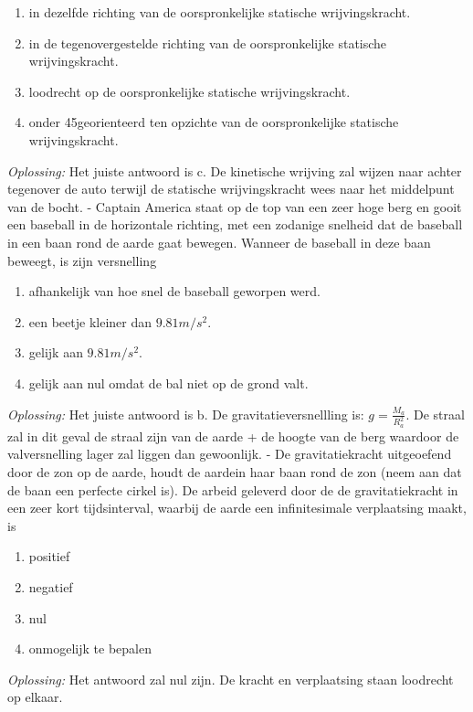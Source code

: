 \documentclass[12pt,a4paper]{article}
\begin{document}
	\begin{enumerate}[label=\alph*]
		\item in dezelfde richting van de oorspronkelijke statische wrijvingskracht.
		\item in de tegenovergestelde richting van de oorspronkelijke statische wrijvingskracht.
		\item loodrecht op de oorspronkelijke statische wrijvingskracht.
		\item onder 45\degree georienteerd ten opzichte van de oorspronkelijke statische wrijvingskracht.
	\end{enumerate}
	\textit{Oplossing:} Het juiste antwoord is c. De kinetische wrijving zal wijzen naar achter tegenover de auto terwijl de statische wrijvingskracht wees naar het middelpunt van de bocht. 
	\newline
	- Captain America staat op de top van een zeer hoge berg en gooit een baseball in de horizontale richting, met een zodanige snelheid dat de baseball in een baan rond de aarde gaat bewegen. Wanneer de baseball in deze baan beweegt, is zijn versnelling
	\begin{enumerate}[label=\alph*]
		\item afhankelijk van hoe snel de baseball geworpen werd.
		\item een beetje kleiner dan \(9.81 m/s^2\).
	 	\item gelijk aan \(9.81 m/s^2\).
	 	\item gelijk aan nul omdat de bal niet op de grond valt. 
	\end{enumerate}
	\textit{Oplossing:} Het juiste antwoord is b. De gravitatieversnellling is: \(g = \frac{M_a}{R_a^2}\). De straal zal in dit geval de straal zijn van de aarde + de hoogte van de berg waardoor de valversnelling lager zal liggen dan gewoonlijk. 
	\newline
	- De gravitatiekracht uitgeoefend door de zon op de aarde, houdt de aardein haar baan rond de zon (neem aan dat de baan een perfecte cirkel is). De arbeid geleverd door de de gravitatiekracht in een zeer kort tijdsinterval, waarbij de aarde een infinitesimale verplaatsing maakt, is
	\begin{enumerate}[label=\alph*]
		\item positief
		\item negatief
		\item nul
		\item onmogelijk te bepalen
	\end{enumerate}
	\textit{Oplossing:} Het antwoord zal nul zijn. De kracht en verplaatsing staan loodrecht op elkaar. 
\end{document}
